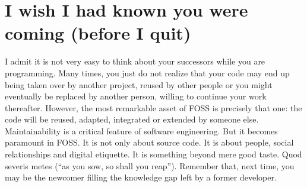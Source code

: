 \section*{I wish I had known you were coming (before I quit)}

I admit it is not very easy to think about your successors while you are programming. Many times, you just do not realize that your code may end up being taken over by another project, reused by other people or you might eventually be replaced by another person, willing to continue your work thereafter.
However, the most remarkable asset of FOSS is precisely that one: the code will be reused, adapted, integrated or extended by someone else. Maintainability is a critical feature of software engineering. But it becomes paramount in FOSS. It is not only about source code. It is about people, social relationships and digital etiquette. It is something beyond mere good taste. Quod severis metes (``as you sow, so shall you reap''). Remember that, next time, you may be the newcomer filling the knowledge gap left by a former developer.
